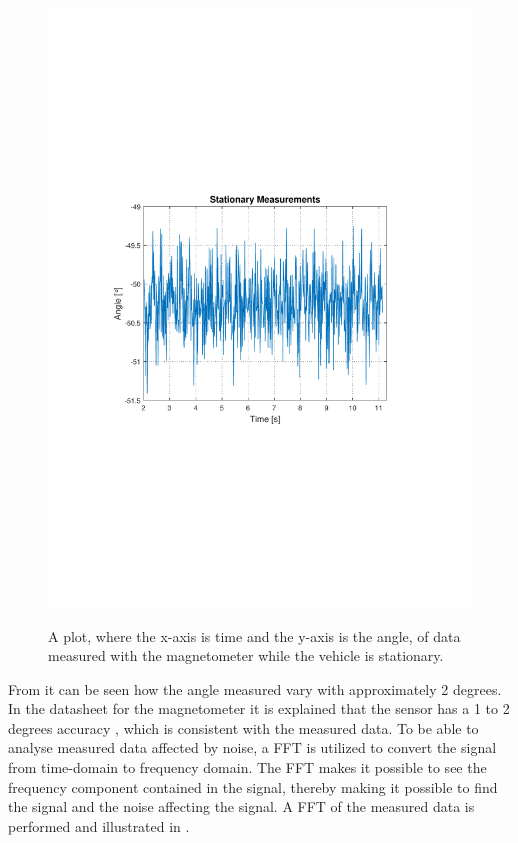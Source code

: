\begin{figure}[H]
  \centering
  {
    \includegraphics[width=1.1\textwidth]{figures/StationaryMeasurements.pdf}
  }
  \caption{A plot, where the x-axis is time and the y-axis is the angle, of data measured with the magnetometer while the vehicle is stationary.}
  \label{fig:StationaryMeasurementsMagnato}
\end{figure}

From  it can be seen how the angle measured vary with approximately 2 degrees. In the datasheet for the magnetometer it is explained that the sensor has a 1 to 2 degrees accuracy \cite{MagnoDatasheet}, which is consistent with the measured data. To be able to analyse measured data affected by noise, a FFT is utilized to convert the signal from time-domain to frequency domain. The FFT makes it possible to see the frequency component contained in the signal, thereby making it possible to find the signal and the noise affecting the signal. A FFT of the measured data is performed and illustrated in .

